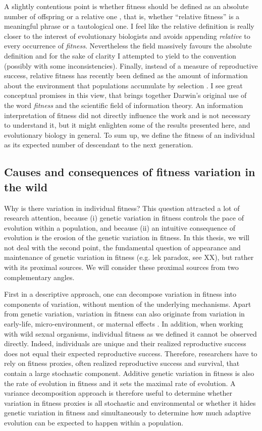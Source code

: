 A slightly contentious point is whether fitness should be defined as an absolute number of offspring \parencite{Wade2006} or a relative one \parencite{Rousset2004}, that is, whether ``relative fitness'' is a meaningful phrase or a tautological one. I feel like the relative definition is really closer to the interest of evolutionary biologists and avoids appending \emph{relative} to every occurrence of \emph{fitness}. Nevertheless the field massively favours the absolute definition and for the sake of clarity I attempted to yield to the convention (possibly with some inconsistencies). 
Finally, instead of a measure of reproductive success, relative fitness has recently been defined as the amount of information about the environment that populations accumulate by selection \parencite{Frank2012V}. I see great conceptual promises in this view, that brings together Darwin's original use of the word \emph{fitness} and the scientific field of information theory. An information interpretation of fitness did not directly influence the work and is not necessary to understand it, but it might enlighten some of the results presented here, and evolutionary biology in general.
To sum up, we define the fitness of an individual as its expected number of descendant to the next generation.

\subsection{Causes and consequences of fitness variation in the wild}
Why is there variation in individual fitness? This question attracted a lot of research attention, because (i) genetic variation in fitness controls the pace of evolution within a population, and because (ii) an intuitive consequence of evolution is the erosion of the genetic variation in fitness. 
In this thesis, we will not deal with the second point, the fundamental question of appearance and maintenance of genetic variation in fitness (e.g. lek paradox, see XX), but rather with its proximal sources.
We will consider these proximal sources from two complementary angles. 

First in a descriptive approach, one can decompose variation in fitness into components of variation, without mention of the underlying mechanisms.
Apart from genetic variation, variation in fitness can also originate from variation in early-life, micro-environment, or maternal effects \parencite{Mcfarlane2015}. In addition, when working with wild sexual organisms, individual fitness as we defined it cannot be observed directly. Indeed, individuals are unique and their realized reproductive success does not equal their expected reproductive success. Therefore, researchers have to rely on fitness proxies, often realized reproductive success and survival, that contain a large stochastic component. Additive genetic variation in fitness is also the rate of evolution in fitness \parencite{Fisher1930} and it sets the maximal rate of evolution. A variance decomposition approach is therefore useful to determine whether variation in fitness proxies is all stochastic and environmental or whether it hides genetic variation in fitness and simultaneously to determine how much adaptive evolution can be expected to happen within a population.

